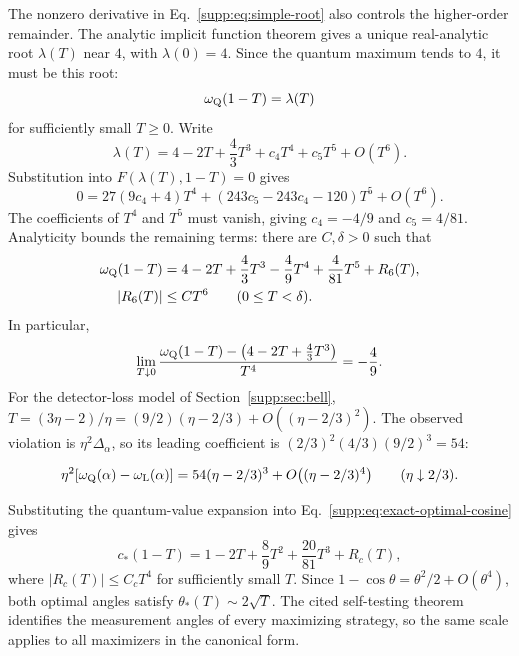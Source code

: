 \documentclass[aps,prl,onecolumn,10pt,superscriptaddress,nofootinbib,longbibliography]{revtex4-2}
\theoremstyle{remark}
\begin{document}
The nonzero derivative in Eq.~\eqref{supp:eq:simple-root} also controls
the higher-order remainder. The analytic implicit function theorem
gives a unique real-analytic root $\lambda(T)$ near $4$, with
$\lambda(0)=4$. Since the quantum maximum tends to $4$, it must be this
root:
\begin{equation}
\omega_{\rm Q}(1-T)=\lambda(T)
\label{supp:eq:quantum-analytic-branch}
\end{equation}
for sufficiently small $T\geq0$.
Write
\[
\lambda(T)=4-2T+\frac43T^3+c_4T^4+c_5T^5+O(T^6).
\]
Substitution into $F(\lambda(T),1-T)=0$ gives
\begin{equation}
0=27(9c_4+4)T^4+(243c_5-243c_4-120)T^5+O(T^6).
\label{supp:eq:coefficient-equations}
\end{equation}
The coefficients of $T^4$ and $T^5$ must vanish, giving
$c_4=-4/9$ and $c_5=4/81$. Analyticity bounds the remaining terms:
there are $C,\delta>0$ such that
\begin{align}
\omega_{\rm Q}(1-T)
&=4-2T+\frac43T^3-\frac49T^4+\frac4{81}T^5+R_6(T),
\label{supp:eq:exact-endpoint-expansion}\\
|R_6(T)|&\leq CT^6\qquad(0\leq T<\delta).
\label{supp:eq:R6-bound}
\end{align}
In particular,
\begin{equation}
\lim_{T\downarrow0}
\frac{\omega_{\rm Q}(1-T)-\left(4-2T+\frac43T^3\right)}{T^4}
=-\frac49.
\label{supp:eq:quartic-limit}
\end{equation}
For the detector-loss model of Section~\ref{supp:sec:bell},
$T=(3\eta-2)/\eta=(9/2)(\eta-2/3)+O((\eta-2/3)^2)$. The observed violation is $\eta^2\Delta_\alpha$, so its leading coefficient is $(2/3)^2(4/3)(9/2)^3=54$:

\[
\eta^2[\omega_{\rm Q}(\alpha)-\omega_{\rm L}(\alpha)]
=54(\eta-2/3)^3+O\bigl((\eta-2/3)^4\bigr)
\qquad (\eta\downarrow2/3).
\]

Substituting the quantum-value expansion into
Eq.~\eqref{supp:eq:exact-optimal-cosine} gives
\begin{equation}
c_*(1-T)=1-2T+\frac89T^2+\frac{20}{81}T^3+R_c(T),
\label{supp:eq:optimal-cosine-expansion}
\end{equation}
where $|R_c(T)|\leq C_cT^4$ for sufficiently small $T$.
Since $1-\cos\theta=\theta^2/2+O(\theta^4)$, both optimal angles
satisfy $\theta_*(T)\sim2\sqrt T$. The cited self-testing theorem
identifies the measurement angles of every maximizing strategy, so the
same scale applies to all maximizers in the canonical form.
\end{document}
